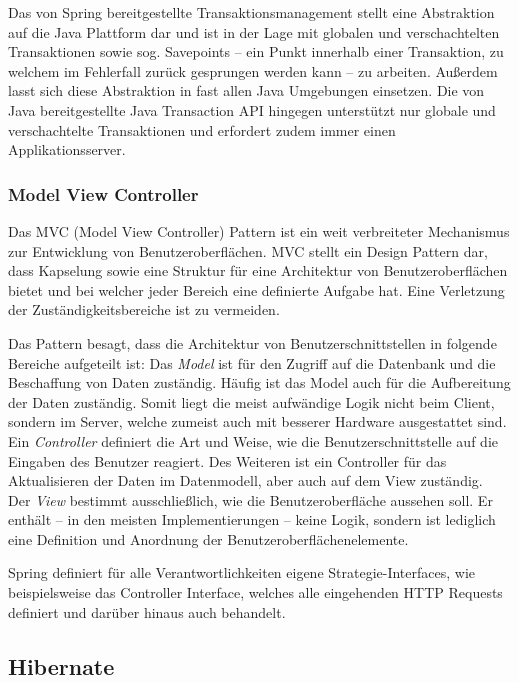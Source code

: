 				Das von Spring bereitgestellte Transaktionsmanagement stellt eine Abstraktion auf die Java Plattform dar und ist in der Lage mit globalen und verschachtelten Transaktionen sowie sog. Savepoints -- ein Punkt innerhalb einer Transaktion, zu welchem im Fehlerfall zurück gesprungen werden kann -- zu arbeiten. Außerdem lasst sich diese Abstraktion in fast allen Java Umgebungen einsetzen. Die von Java bereitgestellte Java Transaction API hingegen unterstützt nur globale und verschachtelte Transaktionen und erfordert zudem immer einen Applikationsserver. 
				
			\subsubsection{Model View Controller} %
		
				Das MVC (Model View Controller) Pattern ist ein weit verbreiteter Mechanismus zur Entwicklung von Benutzeroberflächen. MVC stellt ein Design Pattern dar, dass Kapselung sowie eine Struktur für eine Architektur von Benutzeroberflächen bietet und bei welcher jeder Bereich eine definierte Aufgabe hat. Eine Verletzung der Zuständigkeitsbereiche ist zu vermeiden. \cite{Gamma.1995}
				
				Das Pattern besagt, dass die Architektur von Benutzerschnittstellen in folgende Bereiche aufgeteilt ist: Das \textit{Model} ist für den Zugriff auf die Datenbank und die Beschaffung von Daten zuständig. Häufig ist das Model auch für die Aufbereitung der Daten zuständig. Somit liegt die meist aufwändige Logik nicht beim Client, sondern im Server, welche zumeist auch mit besserer Hardware ausgestattet sind. \\
				Ein \textit{Controller} definiert die Art und Weise, wie die Benutzerschnittstelle auf die Eingaben des Benutzer reagiert. Des Weiteren ist ein Controller für das Aktualisieren der Daten im Datenmodell, aber auch auf dem View zuständig. \\
				Der \textit{View} bestimmt ausschließlich, wie die Benutzeroberfläche aussehen soll. Er enthält -- in den meisten Implementierungen -- keine Logik, sondern ist lediglich eine Definition und Anordnung der Benutzeroberflächenelemente.
				
				Spring definiert für alle Verantwortlichkeiten eigene Strategie-Interfaces, wie beispielsweise das Controller Interface, welches alle eingehenden HTTP Requests definiert und darüber hinaus auch behandelt. 
		
		\subsection{Hibernate} %
		
